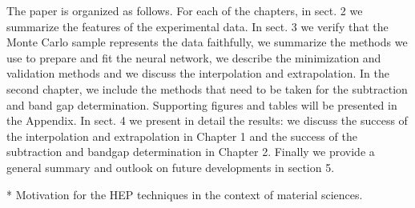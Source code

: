 The paper is organized as follows. For each of the chapters, in sect. 2 we summarize the features of the experimental data. In sect. 3 we verify that the Monte Carlo sample represents the data faithfully, we summarize the methods we use to prepare and fit the neural network, we describe the minimization and validation methods and we discuss the interpolation and extrapolation. In the second chapter, we include the methods that need to be taken for the subtraction and band gap determination. Supporting figures and tables will be presented in the Appendix.
In sect. 4 we present in detail the results: we discuss the success of the interpolation and extrapolation in Chapter 1 and the success of the subtraction and bandgap determination in Chapter 2. Finally we provide a general summary and outlook on future developments in section 5. 



* Motivation for the HEP techniques in the context of material sciences.

